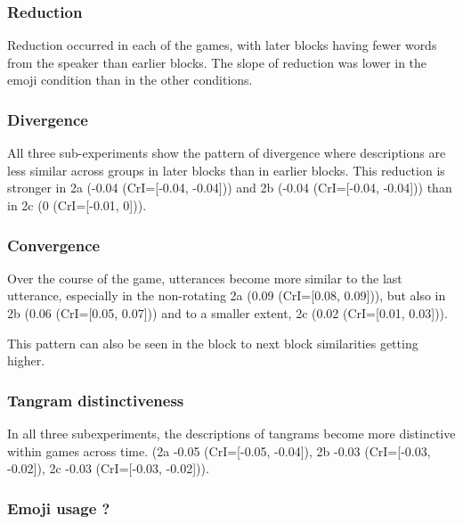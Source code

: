 \documentclass[
  english,
  a4paper,
]{article}
\begin{document}
\hypertarget{reduction-1}{%
\subsubsection{Reduction}\label{reduction-1}}

Reduction occurred in each of the games, with later blocks having fewer words from the speaker than earlier blocks. The slope of reduction was lower in the emoji condition than in the other conditions.

\hypertarget{divergence-1}{%
\subsubsection{Divergence}\label{divergence-1}}

All three sub-experiments show the pattern of divergence where descriptions are less similar across groups in later blocks than in earlier blocks. This reduction is stronger in 2a (-0.04 (CrI={[}-0.04, -0.04{]})) and 2b (-0.04 (CrI={[}-0.04, -0.04{]})) than in 2c (0 (CrI={[}-0.01, 0{]})).

\hypertarget{convergence-1}{%
\subsubsection{Convergence}\label{convergence-1}}

Over the course of the game, utterances become more similar to the last utterance, especially in the non-rotating 2a (0.09 (CrI={[}0.08, 0.09{]})), but also in 2b (0.06 (CrI={[}0.05, 0.07{]})) and to a smaller extent, 2c (0.02 (CrI={[}0.01, 0.03{]})).

This pattern can also be seen in the block to next block similarities getting higher.

\hypertarget{tangram-distinctiveness}{%
\subsubsection{Tangram distinctiveness}\label{tangram-distinctiveness}}

In all three subexperiments, the descriptions of tangrams become more distinctive within games across time. (2a -0.05 (CrI={[}-0.05, -0.04{]}), 2b -0.03 (CrI={[}-0.03, -0.02{]}), 2c -0.03 (CrI={[}-0.03, -0.02{]})).

\hypertarget{emoji-usage}{%
\subsubsection{Emoji usage ?}\label{emoji-usage}}
\end{document}
